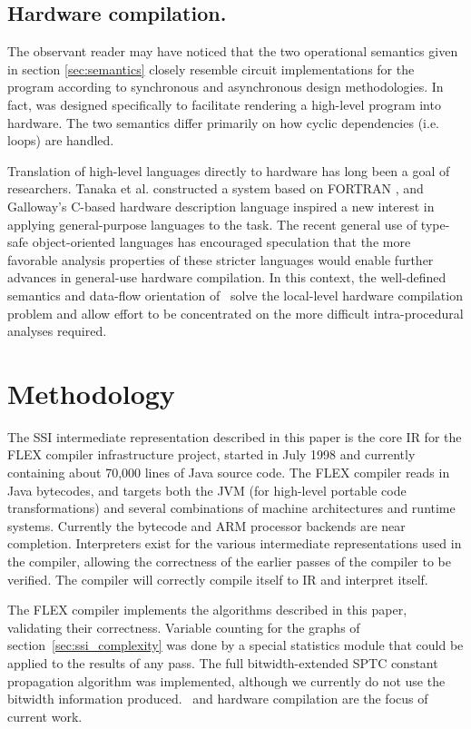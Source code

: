 \documentclass[12pt,titlepage,twoside]{article}
\let\oldsection\section
\renewcommand{\section}{\setcounter{figure}{0}\setcounter{table}{0}\oldsection}
\begin{document}
\subsection{Hardware compilation.}\label{sec:hardware}
The observant reader may have noticed that the two 
operational semantics given in section \ref{sec:semantics} closely
resemble circuit implementations for the program according to
synchronous and asynchronous design methodologies.  In fact,
\ssiplus{} was designed specifically to facilitate rendering a
high-level program into hardware.  The two semantics differ primarily
on how cyclic dependencies (i.e. loops) are handled.

Translation of high-level languages directly to hardware has long been
a goal of researchers.  Tanaka et al. constructed a system based on FORTRAN
\cite{tanaka89:harp}, and Galloway's C-based hardware description
language \cite{galloway95:transmogrifier} inspired a new interest in
applying general-purpose languages to the task.  The recent general
use of type-safe object-oriented languages has encouraged speculation
that the more favorable analysis properties of these stricter
languages would enable further advances in general-use hardware
compilation.  In this context, the well-defined semantics and
data-flow orientation of \ssiplus\ solve the local-level hardware
compilation problem and allow effort to be concentrated on the more
difficult intra-procedural analyses required.

\section{Methodology}\label{sec:methodology}
The SSI intermediate representation described in this paper is the
core IR for the FLEX compiler infrastructure project, started in July
1998 and currently containing about 70,000 lines of Java source code.
The FLEX compiler reads in Java bytecodes, and targets both the JVM
(for high-level portable code transformations) and several
combinations of machine architectures and runtime systems.  Currently
the bytecode and ARM processor backends are near completion.
Interpreters exist for the various intermediate representations used
in the compiler, allowing the correctness of the earlier passes of the
compiler to be verified.  The compiler will correctly compile itself
to IR and interpret itself.

The FLEX compiler implements the algorithms described in this paper,
validating their correctness.  Variable counting for the graphs of
section~\ref{sec:ssi_complexity} was done by a special statistics
module that could be applied to the results of any pass.  The full
bitwidth-extended SPTC constant propagation algorithm was implemented,
although we currently do not use the bitwidth information produced.
\ssiplus\ and hardware compilation are the focus of current work.
\end{document}
